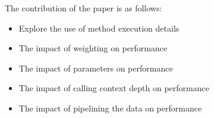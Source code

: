 The contribution of the paper is as follows: 

\begin{itemize}
\item{Explore the use of method execution details}
\item{The impact of weighting on performance}
\item{The impact of parameters on performance}
\item{The impact of calling context depth on performance}
\item{The impact of pipelining the data on performance}
\end{itemize}
